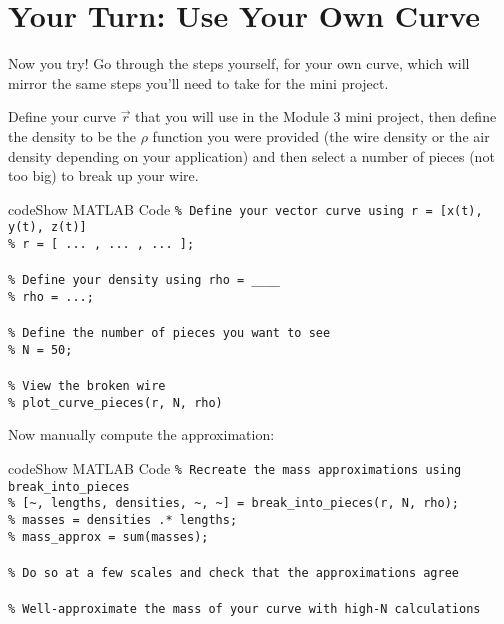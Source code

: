 \documentclass{ximera}
\begin{document}
\section*{Your Turn: Use Your Own Curve}

Now you try! Go through the steps yourself, for your own curve, which will mirror the same steps you'll need to take for the mini project.

Define your curve $\vec{r}$ that you will use in the Module 3 mini project, then define the density to be the $\rho$ function you were provided (the wire density or the air density depending on your application) and then select a number of pieces (not too big) to break up your wire.

\begin{expandable}{code}{Show MATLAB Code}
\texttt{\% Define your vector curve using r = [x(t), y(t), z(t)]}\\
\texttt{\% r = [\; ...\; , \; ...\; , \; ...\; ];}\\
\\
\texttt{\% Define your density using rho = \_\_\_\_}\\
\texttt{\% rho = ...;}\\
\\
\texttt{\% Define the number of pieces you want to see}\\
\texttt{\% N = 50;}\\
\\
\texttt{\% View the broken wire}\\
\texttt{\% plot\_curve\_pieces(r, N, rho)}
\end{expandable}

Now manually compute the approximation:

\begin{expandable}{code}{Show MATLAB Code}
\texttt{\% Recreate the mass approximations using break\_into\_pieces}\\
\texttt{\% [\textasciitilde, lengths, densities, \textasciitilde, \textasciitilde] = break\_into\_pieces(r, N, rho);}\\
\texttt{\% masses = densities .* lengths;}\\
\texttt{\% mass\_approx = sum(masses);}\\
\\
\texttt{\% Do so at a few scales and check that the approximations agree}\\
\\
\texttt{\% Well-approximate the mass of your curve with high-N calculations}
\end{expandable}
\end{document}
